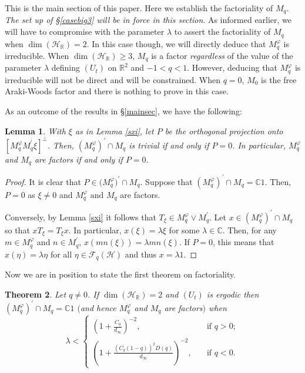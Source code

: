 \documentclass[12pt, a4paper,reqno]{amsart}
\newtheorem{Theorem}{Theorem}[section]
\newtheorem{Lemma}[Theorem]{Lemma}
\theoremstyle{definition}
\renewcommand{\geq}{\geqslant}
\def\C{\mathbb C}
\def\R{\mathbb R}
\newcommand{\CH}{\mathcal{H}}
\begin{document}

This is the main section of this paper. Here we establish the factoriality of $M_q$. \textit{The set up of \S\ref{casebig3} will be in force in this section}. As informed earlier, we will have to compromise with the parameter $\lambda$ to assert the factoriality of $M_q$ when $\dim(\CH_\R)=2$. In this case though, we will directly deduce that $M_q^\varphi$ is irreducible. When $\dim(\CH_\R)\geq 3$, $M_q$ is a factor \textit{regardless} of the value of the parameter $\lambda$ defining $(U_t)$ on $\R^2$ and $-1<q<1$. However, deducing that $M_q^\varphi$ is irreducible will not be direct and will be constrained. When $q=0$, $M_0$ is the free Araki-Woods factor \cite{Shlyakhtenko} and there is nothing to prove in this case. 

As an outcome of the results in \S\ref{mainsec}, we have the following:

\begin{Lemma}\label{car}
With $\xi$ as in Lemma \ref{sxi}, let $P$ be the orthogonal projection onto $[M_q^\varphi M_q^\prime\xi ]^\perp$. Then, $(M_q^\varphi)^\prime\cap M_q$ is trivial if and only if $P=0$. In particular, $M_q^\varphi$ and $M_q$ are factors if and only if $P=0$. 
\end{Lemma}

\begin{proof}
It is clear that $P\in \mathcal (M_q^\varphi)^\prime\cap M_q$. Suppose that $(M_q^\varphi)^\prime\cap M_q=\C1$. Then, $P=0$ as $\xi\neq 0$ and $M_q^\varphi\text{ and } M_q$ are factors. 

Conversely, by Lemma \ref{sxi} it follows that $T_\xi\in M_q^\varphi\vee M_q^\prime$. Let $x\in
(M_q^\varphi)^\prime\cap M_q$ so that $xT_\xi=T_\xi x$. In particular, 
$x(\xi)=\lambda \xi$ for some $\lambda\in \C$. Then, for any $m\in
M_q^\varphi$ and $n\in M_q^\prime$, $x(mn(\xi))=\lambda mn(\xi)$.
If $P=0$, this means that $x(\eta)=\lambda \eta$ for all $\eta\in\mathcal{F}_q(\CH)$ and thus $x=\lambda 1$.
\end{proof}

 
Now we are in position to state the first theorem on factoriality. 

\begin{Theorem}\label{Factor2dim}
Let $q\neq 0$. If $\dim(\CH_\R)=2$ and $(U_t)$ is ergodic then $(M_q^\varphi)^\prime\cap M_q=\C1$ $($and hence $M_q^\varphi$ and $M_q$ are factors$)$ when 
\begin{equation*}
\lambda< \begin{cases}(1+\frac{C_q}{d_\infty})^{-2},\quad&\text{if }q>0;\\
(1+\frac{(C_q(1-q))^2D(q)}{d_\infty})^{-2},\quad &\text{if }q<0.\end{cases}
\end{equation*}
\end{Theorem}
\end{document}
